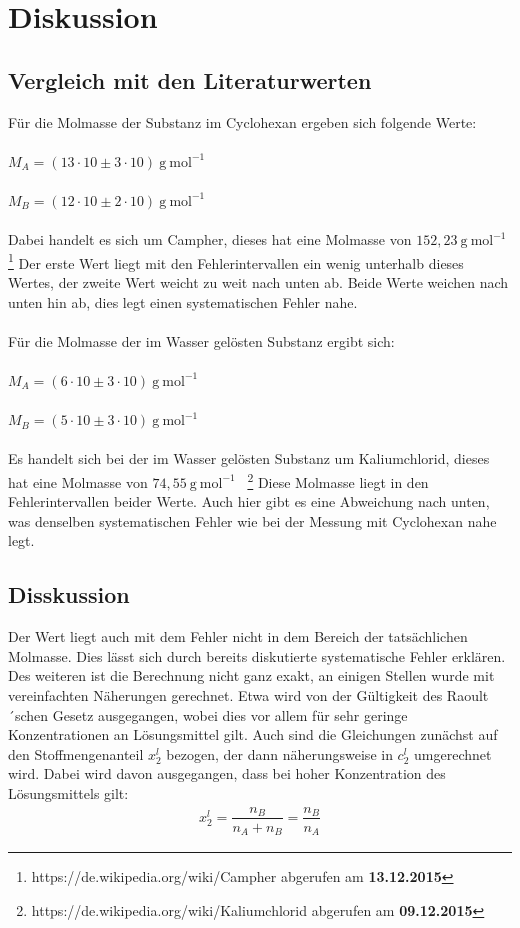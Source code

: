 \documentclass[12pt,a4paper,titlepage,headinclude,bibtotoc]{scrartcl}
\begin{document}
\section{Diskussion}
\subsection{Vergleich mit den Literaturwerten}
Für die Molmasse der Substanz im Cyclohexan ergeben sich folgende Werte:\\\\
$M_A = (13 \cdot 10 \pm 3 \cdot 10){~} \mathrm{g{~}mol^{-1}}$\\\\
$M_B = (12 \cdot 10 \pm 2 \cdot 10){~} \mathrm{g{~}mol^{-1}}$\\\\
Dabei handelt es sich um Campher, dieses hat eine Molmasse von $ 152,23{~} \mathrm{g{~}mol^{-1}}$ \footnote{https://de.wikipedia.org/wiki/Campher abgerufen am \textbf{13.12.2015}} Der erste Wert liegt mit den Fehlerintervallen ein wenig unterhalb dieses Wertes, der zweite Wert weicht zu weit nach unten ab. Beide Werte weichen nach unten hin ab, dies legt einen systematischen Fehler nahe.\\\\
Für die Molmasse der im Wasser gelösten Substanz ergibt sich:\\\\
$M_A = (6 \cdot 10 \pm 3 \cdot 10){~} \mathrm{g{~}mol^{-1}}$\\\\
$M_B = (5\cdot 10 \pm 3\cdot 10 ){~} \mathrm{g{~}mol^{-1}}$\\\\
Es handelt sich bei der im Wasser gelösten Substanz um Kaliumchlorid, dieses hat eine Molmasse von $74,55{~} \mathrm{g{~}mol^{-1}}$ {~}\footnote{https://de.wikipedia.org/wiki/Kaliumchlorid abgerufen am \textbf{09.12.2015}} Diese Molmasse liegt in den Fehlerintervallen beider Werte. Auch hier gibt es eine Abweichung nach unten, was denselben systematischen Fehler wie bei der Messung mit Cyclohexan nahe legt. 


\subsection{Disskussion} 
Der Wert liegt auch mit dem Fehler nicht in dem Bereich der tatsächlichen Molmasse. Dies lässt sich durch bereits diskutierte systematische Fehler erklären. Des weiteren ist die Berechnung nicht ganz exakt, an einigen Stellen wurde mit vereinfachten Näherungen gerechnet. Etwa wird von der Gültigkeit des Raoult´schen Gesetz ausgegangen, wobei dies vor allem für sehr geringe Konzentrationen an Lösungsmittel gilt. Auch sind die Gleichungen zunächst auf den Stoffmengenanteil $x_2^l$ bezogen, der dann näherungsweise in $c_2^l$ umgerechnet wird. Dabei wird davon ausgegangen, dass bei hoher Konzentration des Lösungsmittels gilt:
\begin{align}
x_2^l = \dfrac{n_B}{n_A + n_B} = \dfrac{n_B}{n_A}
\end{align}   
\end{document}

